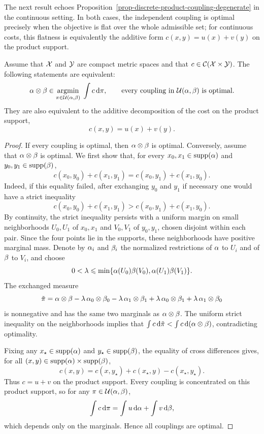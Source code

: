 The next result echoes Proposition~\ref{prop-discrete-product-coupling-degenerate} in the continuous setting. In both cases, the independent coupling is optimal precisely when the objective is flat over the whole admissible set; for continuous costs, this flatness is equivalently the additive form $c(x,y)=u(x)+v(y)$ on the product support.

\begin{prop}\label{prop-product-coupling-degenerate}
	Assume that $\mathcal{X}$ and $\mathcal{Y}$ are compact metric spaces and that $c\in\mathcal{C}(\mathcal{X}\times\mathcal{Y})$. The following statements are equivalent:
	\[
		\alpha\otimes\beta\in\underset{\pi\in\mathcal{U}(\alpha,\beta)}{\operatorname{argmin}}\;\int c\,\mathrm{d}\pi,
		\qquad
		\text{every coupling in }\mathcal{U}(\alpha,\beta)\text{ is optimal}.
	\]
	They are also equivalent to the additive decomposition of the cost on the product support,
	\[
		c(x,y)=u(x)+v(y).
	\]
\end{prop}
\begin{proof}
	If every coupling is optimal, then $\alpha\otimes\beta$ is optimal. Conversely, assume that $\alpha\otimes\beta$ is optimal. We first show that, for every $x_0,x_1\in\operatorname{supp}(\alpha)$ and $y_0,y_1\in\operatorname{supp}(\beta)$,
	\[
		c(x_0,y_0)+c(x_1,y_1)
		=
		c(x_0,y_1)+c(x_1,y_0).
	\]
	Indeed, if this equality failed, after exchanging $y_0$ and $y_1$ if necessary one would have a strict inequality
	\[
		c(x_0,y_0)+c(x_1,y_1)
		>
		c(x_0,y_1)+c(x_1,y_0).
	\]
	By continuity, the strict inequality persists with a uniform margin on small neighborhoods $U_0,U_1$ of $x_0,x_1$ and $V_0,V_1$ of $y_0,y_1$, chosen disjoint within each pair. Since the four points lie in the supports, these neighborhoods have positive marginal mass. Denote by $\alpha_i$ and $\beta_i$ the normalized restrictions of $\alpha$ to $U_i$ and of $\beta$ to $V_i$, and choose
	\[
		0<\lambda\leqslant
		\min\{\alpha(U_0)\beta(V_0),\alpha(U_1)\beta(V_1)\}.
	\]
	The exchanged measure
	\[
		\tilde\pi
		=
		\alpha\otimes\beta
		-\lambda\,\alpha_0\otimes\beta_0
		-\lambda\,\alpha_1\otimes\beta_1
		+\lambda\,\alpha_0\otimes\beta_1
		+\lambda\,\alpha_1\otimes\beta_0
	\]
	is nonnegative and has the same two marginals as $\alpha\otimes\beta$. The uniform strict inequality on the neighborhoods implies that $\int c\,\mathrm{d}\tilde\pi<\int c\,\mathrm{d}(\alpha\otimes\beta)$, contradicting optimality.

	Fixing any $x_\star\in\operatorname{supp}(\alpha)$ and $y_\star\in\operatorname{supp}(\beta)$, the equality of cross differences gives, for all $(x,y)\in\operatorname{supp}(\alpha)\times\operatorname{supp}(\beta)$,
	\[
		c(x,y)=c(x,y_\star)+c(x_\star,y)-c(x_\star,y_\star).
	\]
	Thus $c=u+v$ on the product support. Every coupling is concentrated on this product support, so for any $\pi\in\mathcal{U}(\alpha,\beta)$,
	\[
		\int c\,\mathrm{d}\pi
		=
		\int u\,\mathrm{d}\alpha+\int v\,\mathrm{d}\beta,
	\]
	which depends only on the marginals. Hence all couplings are optimal.
\end{proof}

